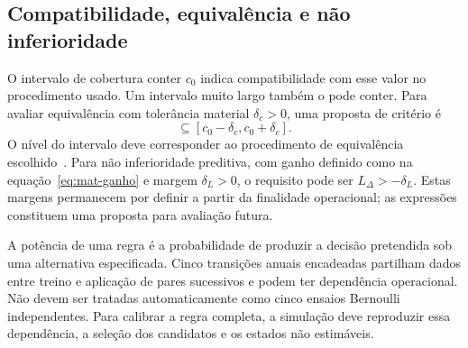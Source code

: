 
\subsection{Compatibilidade, equivalência e não inferioridade}
\label{sec:mat-equivalencia}
O intervalo de cobertura conter $c_0$ indica compatibilidade com esse valor no procedimento usado. Um intervalo muito largo também o pode conter. Para avaliar equivalência com tolerância material $\delta_c>0$, uma proposta de critério é
\begin{equation}
[L_c,U_c]\subseteq[c_0-\delta_c,c_0+\delta_c].
\label{eq:mat-equivalencia}
\end{equation}
O nível do intervalo deve corresponder ao procedimento de equivalência escolhido~\parencite{Lakens2017}. Para não inferioridade preditiva, com ganho definido como na equação~\ref{eq:mat-ganho} e margem $\delta_L>0$, o requisito pode ser $L_\Delta>-\delta_L$. Estas margens permanecem por definir a partir da finalidade operacional; as expressões constituem uma proposta para avaliação futura.

A potência de uma regra é a probabilidade de produzir a decisão pretendida sob uma alternativa especificada. Cinco transições anuais encadeadas partilham dados entre treino e aplicação de pares sucessivos e podem ter dependência operacional. Não devem ser tratadas automaticamente como cinco ensaios Bernoulli independentes. Para calibrar a regra completa, a simulação deve reproduzir essa dependência, a seleção dos candidatos e os estados não estimáveis.

